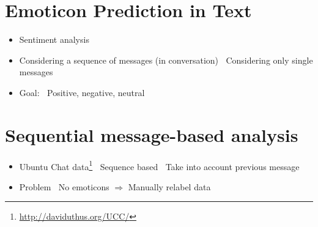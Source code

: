 \documentclass[
paper=128mm:96mm, %
fontsize=11pt, %
pagesize, %
parskip=half-, %
]{scrartcl} %
\newcommand{\red}[1]{\textit{\color{red}{#1}}}
\theoremstyle{mythmstyle} %
\begin{document}
\section{Emoticon Prediction in Text}


\begin{itemize}
\item Sentiment analysis

\item Considering a sequence of messages (in conversation)
\subitem \textbullet $\:$ Considering only single messages

\item Goal: 
\subitem \textbullet $\:$ Positive, negative, neutral

\end{itemize}



\clearpage




\section{Sequential message-based analysis}

\begin{itemize}
\item Ubuntu Chat data\footnote{\url{http://daviduthus.org/UCC/}}
\subitem \textbullet $\:$ Sequence based
\subitem \textbullet $\:$ Take into account previous message

\item Problem
\subitem \textbullet $\:$ No emoticons $\Rightarrow$ Manually relabel data
\end{itemize}


\clearpage
\end{document}
